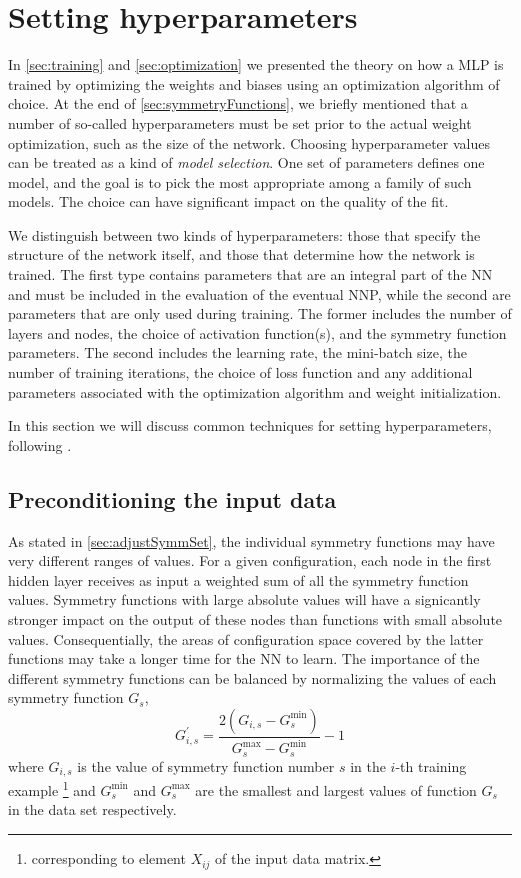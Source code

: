 \documentclass[twoside,english]{uiofysmaster}
\begin{document}
\section{Setting hyperparameters}
In \autoref{sec:training} and \autoref{sec:optimization} we presented the theory on how a MLP is trained 
by optimizing the weights and biases using an optimization algorithm of choice. 
At the end of \autoref{sec:symmetryFunctions}, we briefly mentioned that a number of so-called hyperparameters must be set
prior to the actual weight optimization, such as the size of the network. 
Choosing hyperparameter values can be treated as a
kind of \textit{model selection}. One set of parameters defines one model, and the goal is to pick the most appropriate 
among a family of such models. The choice can have significant impact on the quality of the fit. 

We distinguish between two kinds of hyperparameters: those that specify the structure of the 
network itself, and those that determine how the network is trained. 
The first type contains parameters that are an integral part of the NN and must be included in the evaluation of the eventual NNP, 
while the second are parameters that are only used during training. The former includes the number of layers and nodes, 
the choice of activation function(s), and the symmetry function parameters. The second includes 
the learning rate, the mini-batch size, the number of training iterations, the choice of loss function and any additional 
parameters associated with the optimization algorithm and weight initialization.

In this section we will discuss common techniques for setting hyperparameters, following \cite{Bengio12}. 

\subsection{Preconditioning the input data} \label{sec:transformInputData}
As stated in \autoref{sec:adjustSymmSet}, the individual symmetry functions may have very different ranges of values. 
For a given configuration, each node in the first hidden layer receives as input a weighted sum of all the symmetry function values.
Symmetry functions with large absolute values will have a signicantly stronger impact on the output of these nodes than 
functions with small absolute values. Consequentially, the areas of configuration space covered by the latter functions
may take a longer time for the NN to learn. The importance of the different symmetry functions can be balanced
by normalizing the values \cite{Behler15} of each symmetry function $G_s$, 
\begin{equation}
 G_{i,s}^\prime = \frac{2(G_{i,s} - G^{\min}_s)} {G^{\max}_s - G^{\min}_s} - 1
 \label{scalingInputData}
\end{equation}
where $G_{i,s}$ is the value of symmetry function number $s$ in the $i$-th training example 
\footnote{corresponding to element $X_{ij}$ of the input data matrix.} and
$G_s^{\min}$ and $G_s^{\max}$ are the smallest and largest values of function $G_s$ in the data set respectively.
\end{document}
